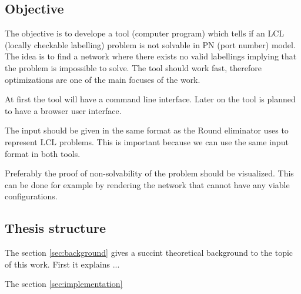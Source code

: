 \subsection{Objective} %
The objective is to develope a tool (computer program) which tells if an LCL (locally checkable labelling) problem is not solvable in PN (port number) model.
The idea is to find a network where there exists no valid labellings implying that the problem is impossible to solve.
The tool should work fast, therefore optimizations are one of the main focuses of the work.

At first the tool will have a command line interface.
Later on the tool is planned to have a browser user interface.

The input should be given in the same format as the Round eliminator uses to represent LCL problems.
This is important because we can use the same input format in both tools.

Preferably the proof of non-solvability of the problem should be visualized.
This can be done for example by rendering the network that cannot have any viable configurations.

\subsection{Thesis structure}
The section \ref{sec:background} gives a succint theoretical background to the topic of this work.
First it explains ... %

The section \ref{sec:implementation}
